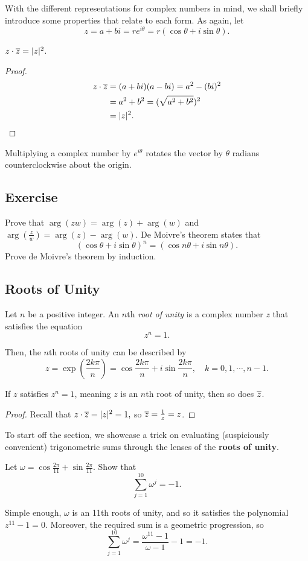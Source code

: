 \documentclass[../jarvis.tex]{subfiles}
\begin{document}
With the different representations for complex numbers in mind, we shall briefly introduce some properties that relate to each form. As again, let $$z=a+bi=re^{i\theta}=r(\cos\theta+i\sin\theta).$$
\begin{proposition}
    $z\cdot\overline{z}=|z|^2$.
\end{proposition}
\begin{proof}
    \begin{align*}
        z\cdot\overline{z}&=(a+bi)(a-bi)=a^2-(bi)^2 \\
        &=a^2+b^2=(\sqrt{a^2+b^2})^2 \\
        &=|z|^2.
    \end{align*}
\end{proof}
\begin{proposition}[Rotation]
    Multiplying a complex number by $e^{i\theta}$ rotates the vector by $\theta$ radians counterclockwise about the origin.
\end{proposition}
\subsection{Exercise}
\problem Prove that $\arg(zw)=\arg(z)+\arg(w)$ and $\arg\left(\frac{z}{w}\right)=\arg(z)-\arg(w)$.
\problem De Moivre's theorem states that $$\left(\cos\theta+i\sin\theta\right)^n=(\cos n\theta+i\sin n\theta).$$ Prove de Moivre's theorem by induction.

\subsection{Roots of Unity \med}
Let $n$ be a positive integer. An $n$th \textit{root of unity} is a complex number $z$ that satisfies the equation $$z^n=1.$$

Then, the $n$th roots of unity can be described by 
$$z=\exp\left(\frac{2k\pi}{n}\right)=\cos\frac{2k\pi}{n}+i\sin\frac{2k\pi}{n},\quad k=0,1,\cdots,n-1.$$

\begin{proposition}[Conjugates]
    If $z$ satisfies $z^n=1$, meaning $z$ is an $n$th root of unity, then so does $\overline{z}$.
\end{proposition}
\begin{proof}
    Recall that $z\cdot\overline{z}=|z|^2=1,$ so $\overline{z}=\frac{1}{z}=z$.
\end{proof}

To start off the section, we showcase a trick on evaluating (suspiciously convenient) trigonometric sums through the lenses of the \textbf{roots of unity}.
\begin{example}
Let $\omega=\cos{\frac{2\pi}{11}}+\sin{\frac{2\pi}{11}}$.
Show that $$\sum_{j=1}^{10} \omega^{j}=-1.$$
\end{example}
Simple enough, $\omega$ is an 11th roots of unity, and so it satisfies the polynomial $z^{11}-1=0$. Moreover, the required sum is a geometric progression, so
$$\sum_{j=1}^{10} \omega^{j}=\frac{\omega^{11}-1}{\omega-1}-1=-1.$$
\end{document}
